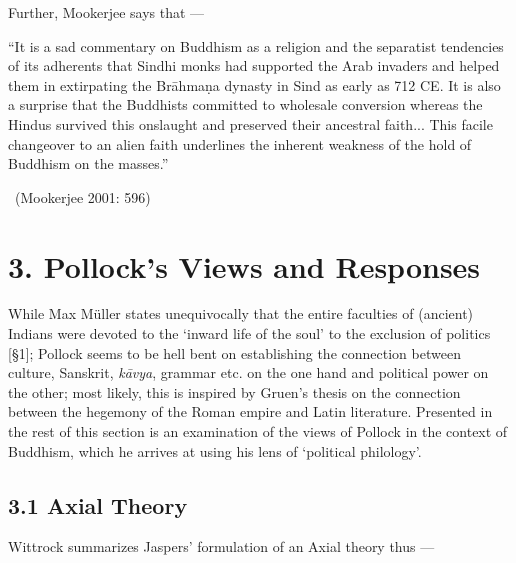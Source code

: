 Further, Mookerjee says that —

\begin{myquote}
“It is a sad commentary on Buddhism as a religion and the separatist tendencies of its adherents that Sindhi monks had supported the Arab invaders and helped them in extirpating the Brāhmaṇa dynasty in Sind as early as 712 CE. It is also a surprise that the Buddhists committed to wholesale conversion whereas the Hindus survived this onslaught and preserved their ancestral faith... This facile changeover to an alien faith underlines the inherent weakness of the hold of Buddhism on the masses.” 

~\hfill (Mookerjee 2001: 596)
\end{myquote}



\section*{3. Pollock’s Views and Responses}

While Max Müller states unequivocally that the entire faculties of (ancient) Indians were devoted to the ‘inward life of the soul’ to the exclusion of politics [§1]; Pollock seems to be hell bent on establishing the connection between culture, Sanskrit, \textit{kāvya}, grammar etc. on the one hand and political power on the other; most likely, this is inspired by Gruen’s thesis on the connection between the hegemony of the Roman empire and Latin literature. Presented in the rest of this section is an examination of the views of Pollock in the context of Buddhism, which he arrives at using his lens of ‘political philology’.

\newpage

\subsection*{3.1 Axial Theory}

Wittrock summarizes Jaspers’ formulation of an Axial theory thus —

